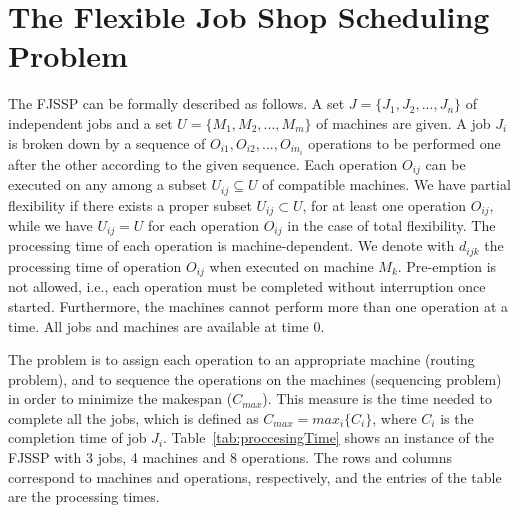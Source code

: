 \section{The Flexible Job Shop Scheduling Problem} \label{sec:FJSSP}
\vspace{-0.4cm}
The FJSSP can be formally described as follows. A set $J = \{J_1, J_2, . . . , J_n\}$ of independent jobs and a set $U = \{M_1,M_2, . . . , M_m\}$ of machines are given. A job $J_i$ is broken down by a sequence of $O_{i1},O_{i2}, . . . , O_{in_i}$ operations to be performed one after the other according to the given sequence. Each operation $O_{ij}$ can be executed on any among a subset $U_{ij} \subseteq U$ of compatible machines. We have partial flexibility if there exists a proper subset $U_{ij} \subset U$, for at least one operation $O_{ij}$, while we have $U_{ij} =U$ for each operation $O_{ij}$ in the case of total flexibility. The processing time of each operation is machine-dependent. We denote with $d_{ijk}$ the processing time of operation $O_{ij}$ when executed on machine $M_k$. Pre-emption is not allowed, i.e., each operation must be completed without interruption once started. Furthermore, the machines cannot perform more than one operation at a time. All jobs and machines are available at time 0.

The problem is to assign each operation to an appropriate machine (routing problem), and to sequence the operations on the machines (sequencing problem) in order to minimize the makespan ($C_{max}$). This measure is the time needed to complete all the jobs, which is defined as $C_{max} = max_i\{C_i\}$, where $C_i$ is the completion time of job $J_i$.  Table~\ref{tab:proccesingTime} shows an instance of the FJSSP with 3 jobs, 4 machines and 8 operations. The rows and columns correspond to machines and operations, respectively, and the entries of the table are the processing times. %

